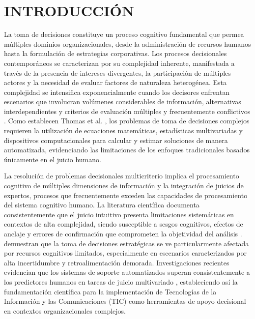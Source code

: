 \introduction
\chapter*{INTRODUCCIÓN}

La toma de decisiones constituye un proceso cognitivo fundamental que permea múltiples dominios organizacionales, desde la administración de recursos humanos hasta la formulación de estrategias corporativas. Los procesos decisionales contemporáneos se caracterizan por su complejidad inherente, manifestada a través de la presencia de intereses divergentes, la participación de múltiples actores y la necesidad de evaluar factores de naturaleza heterogénea. Esta complejidad se intensifica exponencialmente cuando los decisores enfrentan escenarios que involucran volúmenes considerables de información, alternativas interdependientes y criterios de evaluación múltiples y frecuentemente conflictivos \citep{cinelli2021}. Como establecen Thomas et al. \citep{thomas2023}, los problemas de toma de decisiones complejos requieren la utilización de ecuaciones matemáticas, estadísticas multivariadas y dispositivos computacionales para calcular y estimar soluciones de manera automatizada, evidenciando las limitaciones de los enfoques tradicionales basados únicamente en el juicio humano.

La resolución de problemas decisionales multicriterio implica el procesamiento cognitivo de múltiples dimensiones de información y la integración de juicios de expertos, procesos que frecuentemente exceden las capacidades de procesamiento del sistema cognitivo humano. La literatura científica documenta consistentemente que el juicio intuitivo presenta limitaciones sistemáticas en contextos de alta complejidad, siendo susceptible a sesgos cognitivos, efectos de anclaje y errores de confirmación que comprometen la objetividad del análisis \citep{berthet2021}. \citep{fugener2021} demuestran que la toma de decisiones estratégicas se ve particularmente afectada por recursos cognitivos limitados, especialmente en escenarios caracterizados por alta incertidumbre y retroalimentación demorada. Investigaciones recientes evidencian que los sistemas de soporte automatizados superan consistentemente a los predictores humanos en tareas de juicio multivariado \citep{rahim2023}, estableciendo así la fundamentación científica para la implementación de Tecnologías de la Información y las Comunicaciones (TIC) como herramientas de apoyo decisional en contextos organizacionales complejos.

